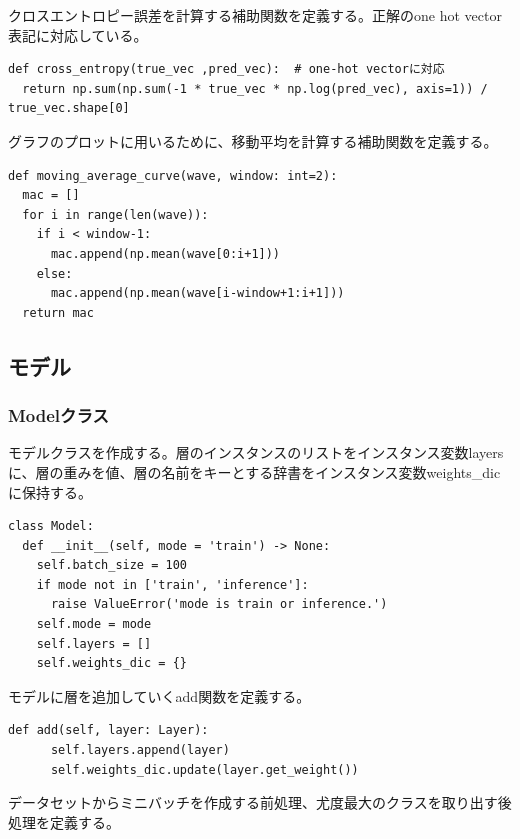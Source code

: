 \documentclass[platex,dvipdfmx]{jsarticle}
\begin{document}
クロスエントロピー誤差を計算する補助関数を定義する。正解のone hot vector 表記に対応している。

\begin{lstlisting}[caption=ex\_advanced.py, label=crossEntropy]
def cross_entropy(true_vec ,pred_vec):  # one-hot vectorに対応
  return np.sum(np.sum(-1 * true_vec * np.log(pred_vec), axis=1)) / true_vec.shape[0]
\end{lstlisting}

グラフのプロットに用いるために、移動平均を計算する補助関数を定義する。

\begin{lstlisting}[caption=ex\_advanced.py, label=mae]
def moving_average_curve(wave, window: int=2):
  mac = []
  for i in range(len(wave)):
    if i < window-1:
      mac.append(np.mean(wave[0:i+1]))
    else:
      mac.append(np.mean(wave[i-window+1:i+1]))
  return mac
\end{lstlisting}

\newpage

\subsection{モデル}

\subsubsection{Modelクラス}

モデルクラスを作成する。層のインスタンスのリストをインスタンス変数layersに、層の重みを値、層の名前をキーとする辞書をインスタンス変数weights\_dicに保持する。

\begin{lstlisting}[caption=ex\_advanced.py, label=Model]
class Model:
  def __init__(self, mode = 'train') -> None:
    self.batch_size = 100
    if mode not in ['train', 'inference']:
      raise ValueError('mode is train or inference.')
    self.mode = mode
    self.layers = []
    self.weights_dic = {}
\end{lstlisting}

モデルに層を追加していくadd関数を定義する。

\begin{lstlisting}[caption=ex\_advanced.py, label=add]
  def add(self, layer: Layer):
      self.layers.append(layer)
      self.weights_dic.update(layer.get_weight())
\end{lstlisting}

データセットからミニバッチを作成する前処理、尤度最大のクラスを取り出す後処理を定義する。
\end{document}

